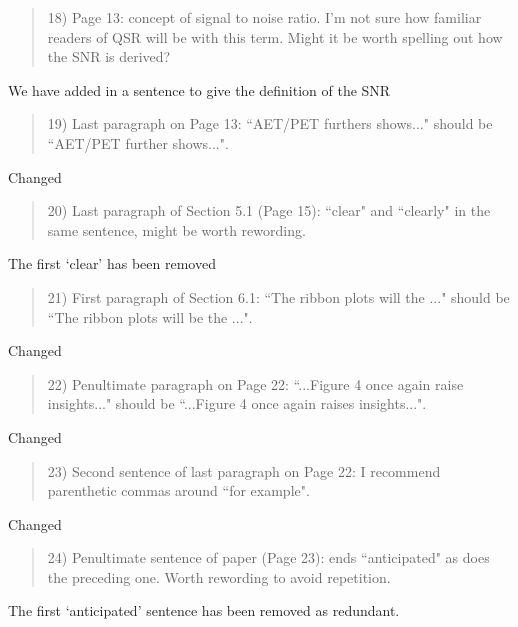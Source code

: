 \documentclass[a4paper,11pt]{article}
\begin{document}
\begin{framed} \begin{quote}
18) Page 13: concept of signal to noise ratio.  I'm not sure how familiar readers of QSR will be with this term.  Might it be worth spelling out how the SNR is derived?
\end{quote} \end{framed}
We have added in a sentence to give the definition of the SNR

\begin{framed} \begin{quote}
19) Last paragraph on Page 13: ``AET/PET furthers shows..." should be ``AET/PET further shows...".
\end{quote} \end{framed}
Changed

\begin{framed} \begin{quote}
20) Last paragraph of Section 5.1 (Page 15): ``clear" and ``clearly" in the same sentence, might be worth rewording.
\end{quote} \end{framed}
The first `clear' has been removed

\begin{framed} \begin{quote}
21) First paragraph of Section 6.1: ``The ribbon plots will the ..." should be ``The ribbon plots will be the ...".
\end{quote} \end{framed}
Changed

\begin{framed} \begin{quote}
22) Penultimate paragraph on Page 22: ``...Figure 4 once again raise insights..." should be ``...Figure 4 once again raises insights...".
\end{quote} \end{framed}
Changed

\begin{framed} \begin{quote}
23) Second sentence of last paragraph on Page 22: I recommend parenthetic commas around ``for example".
\end{quote} \end{framed}
Changed

\begin{framed} \begin{quote}
24) Penultimate sentence of paper (Page 23): ends ``anticipated" as does the preceding one. Worth rewording to avoid repetition.
\end{quote} \end{framed}
The first `anticipated' sentence has been removed as redundant.
\end{document}
